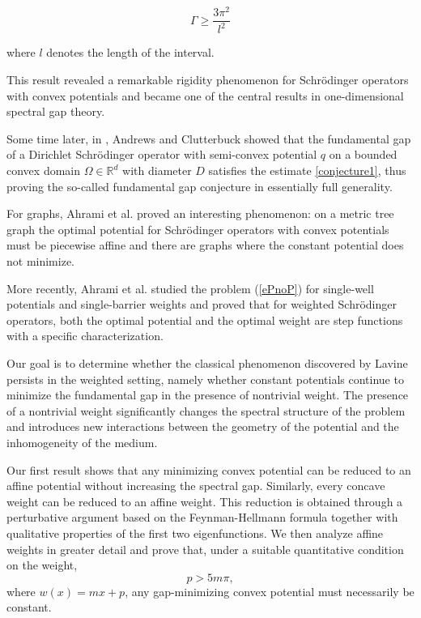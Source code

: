 \documentclass[12pt,a4paper]{amsart}
\begin{document}
\begin{equation}\label{conjecture1}
 \Gamma\geqslant \frac{3\pi^{2}}{l^{2}} 
\end{equation}

\noindent where $l$ denotes the length of the interval.

This result revealed a remarkable rigidity phenomenon
for Schr\"odinger operators with convex potentials and became one of the central results in one-dimensional
spectral gap theory.

Some time later, in \cite{Andrews}, Andrews and Clutterbuck showed that the
fundamental gap of a Dirichlet Schr{\"o}dinger operator with semi-convex potential $q$ on a bounded convex domain $\Omega\in \mathbb{R}^{d}$ with diameter $D$ satisfies the estimate \eqref{conjecture1}, thus proving the so-called fundamental gap conjecture in essentially full generality. 

For graphs, Ahrami et al. \cite{AHEK} proved an interesting phenomenon: on a metric tree graph the optimal
potential for Schr\"odinger operators with convex potentials must be piecewise affine and there are graphs where the constant potential
does not minimize.

More recently, Ahrami et al. \cite{AHRA} studied the problem (\ref{ePnoP}) for single-well potentials and single-barrier weights and proved that for weighted Schr\"{o}dinger operators, both the optimal potential and the optimal weight are step functions with a specific characterization.

Our goal is to determine
whether the classical phenomenon discovered by Lavine
persists in the weighted setting, namely whether constant potentials continue to minimize the fundamental gap in the presence of nontrivial weight. The presence of a nontrivial weight significantly changes the spectral structure of the problem and introduces new interactions between the geometry
of the potential and the inhomogeneity of the medium.


Our first result shows that any minimizing convex potential can be reduced to an affine potential without increasing the spectral gap. Similarly, every concave weight can be reduced to an affine weight. This reduction is obtained through a perturbative argument based on the Feynman-Hellmann formula together with qualitative properties of the first two eigenfunctions. We then analyze affine weights in greater detail and prove that, under a suitable quantitative condition on the weight,
\[p > 5m\pi,
\]
where \(w(x)=mx+p\), any gap-minimizing convex potential must necessarily be constant.
\end{document}
